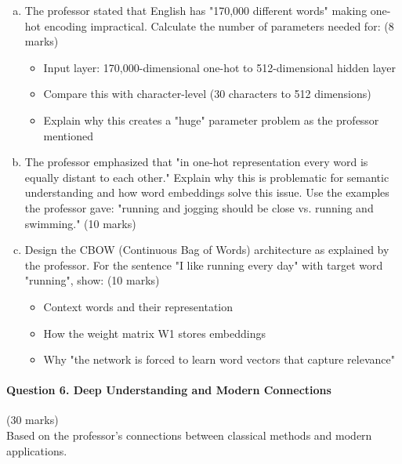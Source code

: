 \documentclass[12pt]{article}
\newcommand{\mediumanswer}{\vspace{3cm}}
\begin{document}
\begin{enumerate}[(a)]
    \item The professor stated that English has "170,000 different words" making one-hot encoding impractical. Calculate the number of parameters needed for: \hfill (8 marks)
    \begin{itemize}
        \item Input layer: 170,000-dimensional one-hot to 512-dimensional hidden layer
        \item Compare this with character-level (30 characters to 512 dimensions)
        \item Explain why this creates a "huge" parameter problem as the professor mentioned
    \end{itemize}
    
    \mediumanswer
    
    \item The professor emphasized that "in one-hot representation every word is equally distant to each other." Explain why this is problematic for semantic understanding and how word embeddings solve this issue. Use the examples the professor gave: "running and jogging should be close vs. running and swimming." \hfill (10 marks)
    
    \mediumanswer
    
    \item Design the CBOW (Continuous Bag of Words) architecture as explained by the professor. For the sentence "I like running every day" with target word "running", show: \hfill (10 marks)
    \begin{itemize}
        \item Context words and their representation
        \item How the weight matrix W1 stores embeddings
        \item Why "the network is forced to learn word vectors that capture relevance"
    \end{itemize}
    
    \mediumanswer
\end{enumerate}

\newpage
\paragraph{Question 6. Deep Understanding and Modern Connections}\hfill (30 marks)\\
Based on the professor's connections between classical methods and modern applications.
\end{document}
